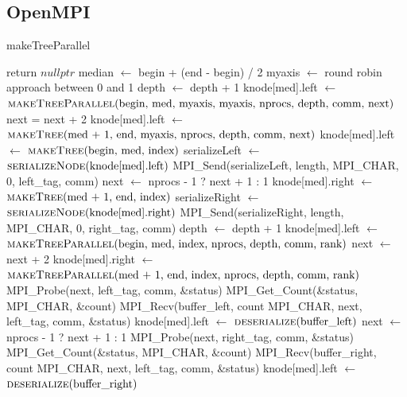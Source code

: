 \documentclass[11pt,a4paper]{article}
\begin{document}
\subsection{OpenMPI}
\begin{algorithm}[H]
\caption{makeTreeParallel}
\begin{algorithmic}[1]
	\State return $\textit{nullptr}$
\EndIf
\State median $\gets$ begin + (end - begin) / 2
\State {}
\State myaxis $\gets$ round robin approach between 0 and 1
		\State depth $\gets$ depth + 1
		\State knode[med].left $\gets$ $\Call{makeTreeParallel}{$begin, med, myaxis, myaxis, nprocs, depth, comm, next$}$
		\State next = next + 2
		\State knode[med].left $\gets$ $\Call{makeTree}{$med + 1, end, myaxis, nprocs, depth, comm, next$}$
\Else
		\State knode[med].left $\gets$ $\Call{makeTree}{$begin, med, index$}$
		\color{red}
		\State serializeLeft $\gets$ $\Call{serializeNode}{$knode[med].left$}$
		\color{black}
		\color{blue}
		\State MPI\_Send(serializeLeft, length, MPI\_CHAR, 0, left\_tag, comm)
		\color{black}
	\EndIf
	\State next $\gets$ nprocs - 1 ? next + 1 : 1
		\State knode[med].right $\gets$ $\Call{makeTree}{$med + 1, end, index$}$
		\color{black}
\color{red}
		\State serializeRight $\gets$ $\Call{serializeNode}{$knode[med].right$}$
		\color{black}
		\color{blue}
		\State MPI\_Send(serializeRight, length, MPI\_CHAR, 0, right\_tag, comm)
		\color{black}
	\EndIf
\EndIf
{}
		\State depth $\gets$ depth + 1
		\State knode[med].left $\gets$ $\Call{makeTreeParallel}{$begin, med, index, nprocs, depth, comm, rank$}$
		\State next $\gets$ next + 2
		\State knode[med].right $\gets$ $\Call{makeTreeParallel}{$med + 1, end, index, nprocs, depth, comm, rank$}$
	\Else 
		\color{blue}
		\State MPI\_Probe(next, left\_tag, comm, \&status)
		\State MPI\_Get\_Count(\&status, MPI\_CHAR, \&count)
		\State MPI\_Recv(buffer\_left, count MPI\_CHAR, next, left\_tag, comm, \&status)
		\color{red}
		\State knode[med].left $\gets$ $\Call{deserialize}{$buffer\_left$}$
		\color{black}
		\State next $\gets$ nprocs - 1 ? next + 1 : 1
		\color{blue}
		\State MPI\_Probe(next, right\_tag, comm, \&status)
		\State MPI\_Get\_Count(\&status, MPI\_CHAR, \&count)
		\State MPI\_Recv(buffer\_right, count MPI\_CHAR, next, left\_tag, comm, \&status)
		\color{red}
		\State knode[med].left $\gets$ $\Call{deserialize}{$buffer\_right$}$
		\color{black}
	\EndIf
\EndIf
\State \Return {}
\EndFunction
\end{algorithmic}
\end{algorithm}
\end{document}
